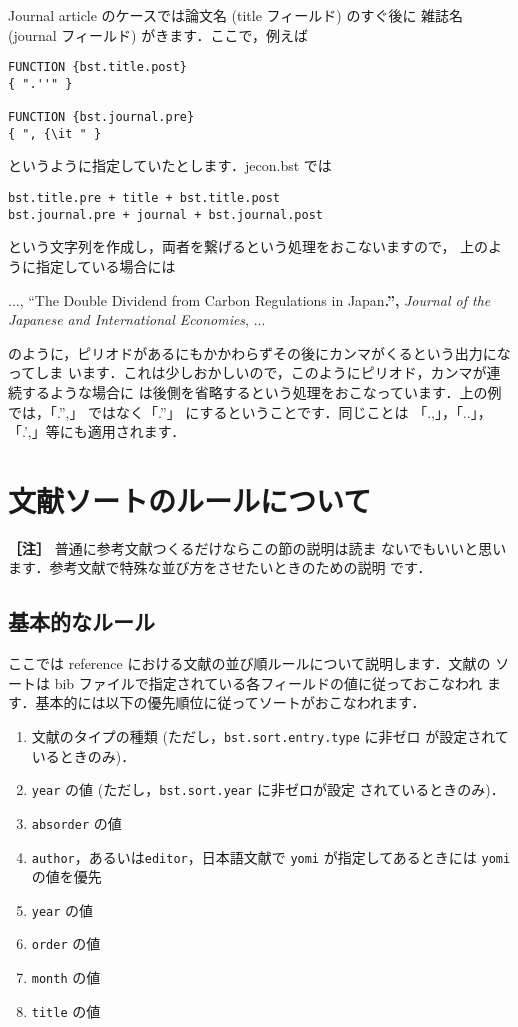 \documentclass[a4j,10pt]{jarticle}
\begin{document}
Journal article のケースでは論文名 (title フィールド) のすぐ後に
雑誌名 (journal フィールド) がきます．ここで，例えば
\begin{screen}
\begin{verbatim}
FUNCTION {bst.title.post}
{ ".''" }

FUNCTION {bst.journal.pre}
{ ", {\it " }
\end{verbatim}
\end{screen}
というように指定していたとします．jecon.bst では
\begin{center}
\verb|bst.title.pre + title + bst.title.post| \\
\verb|bst.journal.pre + journal + bst.journal.post|
\end{center}
という文字列を作成し，両者を繋げるという処理をおこないますので，
上のように指定している場合には
\begin{flushleft}
 ..., ``The Double Dividend from Carbon Regulations in Japan\textbf{.'',} \textit{Journal of the Japanese and International Economies}, ...
\end{flushleft}
のように，ピリオドがあるにもかかわらずその後にカンマがくるという出力になってしま
います．これは少しおかしいので，このようにピリオド，カンマが連続するような場合に
は後側を省略するという処理をおこなっています．上の例では，「.'',」 ではなく「.''」
にするということです．同じことは 「.,」，「..」，「.',」等にも適用されます．



\section{文献ソートのルールについて}
\label{sec:sort_rule}

\noindent \textbf{［注］} 普通に参考文献つくるだけならこの節の説明は読ま
ないでもいいと思います．参考文献で特殊な並び方をさせたいときのための説明
です．

\subsection{基本的なルール}

ここでは reference における文献の並び順ルールについて説明します．文献の
ソートは bib ファイルで指定されている各フィールドの値に従っておこなわれ
ます．基本的には以下の優先順位に従ってソートがおこなわれます．
\begin{enumerate}
 \item 文献のタイプの種類 (ただし，\texttt{bst.sort.entry.type} に非ゼロ
       が設定されているときのみ)．
 \item \texttt{year} の値 (ただし，\texttt{bst.sort.year} に非ゼロが設定
       されているときのみ)．
 \item \texttt{absorder} の値
 \item \texttt{author}，あるいは\texttt{editor}，日本語文献で
       \texttt{yomi} が指定してあるときには \texttt{yomi} の値を優先
 \item \texttt{year} の値
 \item \texttt{order} の値
 \item \texttt{month} の値
 \item \texttt{title} の値
\end{enumerate}
\end{document}
